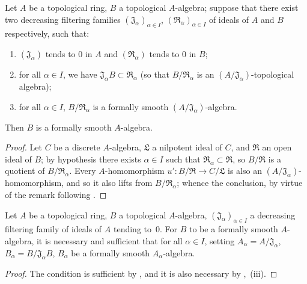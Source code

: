 \begin{proposition}[19.4.1]
\label{0.19.4.1}
Let $A$ be a topological ring, $B$ a topological $A$-algebra;
suppose that there exist two decreasing filtering families $(\mathfrak{J}_\alpha)_{\alpha\in I}$, $(\mathfrak{R}_\alpha)_{\alpha\in I}$ of ideals of $A$ and $B$ respectively, such that:
\begin{enumerate}
  \item[$1^\circ$] $(\mathfrak{J}_\alpha)$ tends to $0$ in $A$ and $(\mathfrak{R}_\alpha)$ tends to $0$ in $B$;
  \item[$2^\circ$] for all $\alpha\in I$, we have $\mathfrak{J}_\alpha B\subset\mathfrak{R}_\alpha$ (so that $B/\mathfrak{R}_\alpha$ is an $(A/\mathfrak{J}_\alpha)$-topological algebra);
  \item[$3^\circ$] for all $\alpha\in I$, $B/\mathfrak{R}_\alpha$ is a formally smooth $(A/\mathfrak{J}_\alpha)$-algebra.
\end{enumerate}
Then $B$ is a formally smooth $A$-algebra.
\end{proposition}

\begin{proof}
Let $C$ be a discrete $A$-algebra, $\mathfrak{L}$ a nilpotent ideal of $C$, and $\mathfrak{R}$ an open ideal of $B$;
by hypothesis there exists $\alpha\in I$ such that $\mathfrak{R}_\alpha\subset\mathfrak{R}$, so $B/\mathfrak{R}$ is a quotient of $B/\mathfrak{R}_\alpha$.
Every $A$-homomorphism $u':B/\mathfrak{R}\to C/\mathfrak{L}$ is also an $(A/\mathfrak{J}_\alpha)$-homomorphism, and so it also lifts from $B/\mathfrak{R}_\alpha$;
whence the conclusion, by virtue of the remark following .
\end{proof}

\begin{corollary}[19.4.2]
\label{0.19.4.2}
Let $A$ be a topological ring, $B$ a topological $A$-algebra, $(\mathfrak{J}_\alpha)_{\alpha\in I}$ a decreasing filtering family of ideals of $A$ tending to~$0$.
For $B$ to be a formally smooth $A$-algebra, it is necessary and sufficient that for all $\alpha\in I$, setting $A_\alpha=A/\mathfrak{J}_\alpha$, $B_\alpha=B/\mathfrak{J}_\alpha B$, $B_\alpha$ be a formally smooth $A_\alpha$-algebra.
\end{corollary}

\begin{proof}
The condition is sufficient by , and it is also necessary by ,~(iii).
\end{proof}

